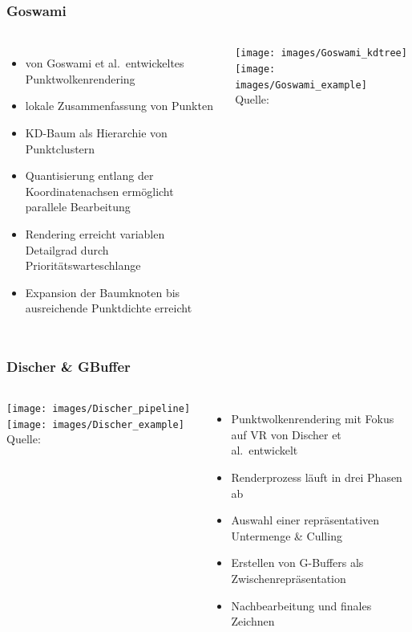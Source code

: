 \documentclass[aspectratio=169]{beamer}
\begin{document}
\begin{frame}
    \frametitle{Goswami}
    \begin{columns}
        \begin{itemize}
            \item von Goswami et al.\ entwickeltes Punktwolkenrendering
            \item lokale Zusammenfassung von Punkten
            \item KD-Baum als Hierarchie von Punktclustern
            \item Quantisierung entlang der Koordinatenachsen ermöglicht parallele Bearbeitung
            \item Rendering erreicht variablen Detailgrad durch Prioritätswarteschlange
            \item Expansion der Baumknoten bis ausreichende Punktdichte erreicht
        \end{itemize}
    
    \texttt{[image: images/Goswami\_kdtree]}
    \texttt{[image: images/Goswami\_example]}
    \centering
        \\[-1ex]{\tiny Quelle:~\cite{goswami2010high}}
    \end{columns}
\end{frame}

\begin{frame}
    \frametitle{Discher \& GBuffer}
    \begin{columns}
    \texttt{[image: images/Discher\_pipeline]}
    \texttt{[image: images/Discher\_example]}
    \centering
    \\[-1ex]{\tiny Quelle:~\cite{discher2018point}}

        \begin{itemize}
            \item Punktwolkenrendering mit Fokus auf VR von Discher et al.\ entwickelt
            \item Renderprozess läuft in drei Phasen ab
            \item Auswahl einer repräsentativen Untermenge \& Culling
            \item Erstellen von G-Buffers als Zwischenrepräsentation
            \item Nachbearbeitung und finales Zeichnen
        \end{itemize}
    \end{columns}
\end{frame}
\end{document}
